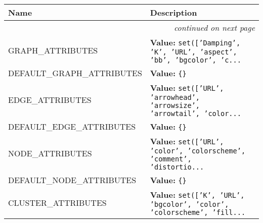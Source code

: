     \vspace{-1cm}
\hspace{\varindent}\begin{longtable}{|p{\varnamewidth}|p{\vardescrwidth}|l}
\cline{1-2}
\cline{1-2} \centering \textbf{Name} & \centering \textbf{Description}& \\
\cline{1-2}
\endhead\cline{1-2}\multicolumn{3}{r}{\small\textit{continued on next page}}\\\endfoot\cline{1-2}
\endlastfoot\raggedright G\-R\-A\-P\-H\-\_\-A\-T\-T\-R\-I\-B\-U\-T\-E\-S\- & \raggedright \textbf{Value:} 
{\tt \texttt{set([}\texttt{'}\texttt{Damping}\texttt{'}\texttt{, }\texttt{'}\texttt{K}\texttt{'}\texttt{, }\texttt{'}\texttt{URL}\texttt{'}\texttt{, }\texttt{'}\texttt{aspect}\texttt{'}\texttt{, }\texttt{'}\texttt{bb}\texttt{'}\texttt{, }\texttt{'}\texttt{bgcolor}\texttt{'}\texttt{, }\texttt{'}\texttt{c}\texttt{...}}&\\
\cline{1-2}
\raggedright D\-E\-F\-A\-U\-L\-T\-\_\-G\-R\-A\-P\-H\-\_\-A\-T\-T\-R\-I\-B\-U\-T\-E\-S\- & \raggedright \textbf{Value:} 
{\tt \texttt{\{}\texttt{\}}}&\\
\cline{1-2}
\raggedright E\-D\-G\-E\-\_\-A\-T\-T\-R\-I\-B\-U\-T\-E\-S\- & \raggedright \textbf{Value:} 
{\tt \texttt{set([}\texttt{'}\texttt{URL}\texttt{'}\texttt{, }\texttt{'}\texttt{arrowhead}\texttt{'}\texttt{, }\texttt{'}\texttt{arrowsize}\texttt{'}\texttt{, }\texttt{'}\texttt{arrowtail}\texttt{'}\texttt{, }\texttt{'}\texttt{color}\texttt{...}}&\\
\cline{1-2}
\raggedright D\-E\-F\-A\-U\-L\-T\-\_\-E\-D\-G\-E\-\_\-A\-T\-T\-R\-I\-B\-U\-T\-E\-S\- & \raggedright \textbf{Value:} 
{\tt \texttt{\{}\texttt{\}}}&\\
\cline{1-2}
\raggedright N\-O\-D\-E\-\_\-A\-T\-T\-R\-I\-B\-U\-T\-E\-S\- & \raggedright \textbf{Value:} 
{\tt \texttt{set([}\texttt{'}\texttt{URL}\texttt{'}\texttt{, }\texttt{'}\texttt{color}\texttt{'}\texttt{, }\texttt{'}\texttt{colorscheme}\texttt{'}\texttt{, }\texttt{'}\texttt{comment}\texttt{'}\texttt{, }\texttt{'}\texttt{distortio}\texttt{...}}&\\
\cline{1-2}
\raggedright D\-E\-F\-A\-U\-L\-T\-\_\-N\-O\-D\-E\-\_\-A\-T\-T\-R\-I\-B\-U\-T\-E\-S\- & \raggedright \textbf{Value:} 
{\tt \texttt{\{}\texttt{\}}}&\\
\cline{1-2}
\raggedright C\-L\-U\-S\-T\-E\-R\-\_\-A\-T\-T\-R\-I\-B\-U\-T\-E\-S\- & \raggedright \textbf{Value:} 
{\tt \texttt{set([}\texttt{'}\texttt{K}\texttt{'}\texttt{, }\texttt{'}\texttt{URL}\texttt{'}\texttt{, }\texttt{'}\texttt{bgcolor}\texttt{'}\texttt{, }\texttt{'}\texttt{color}\texttt{'}\texttt{, }\texttt{'}\texttt{colorscheme}\texttt{'}\texttt{, }\texttt{'}\texttt{fill}\texttt{...}}&\\

\end{longtable}
